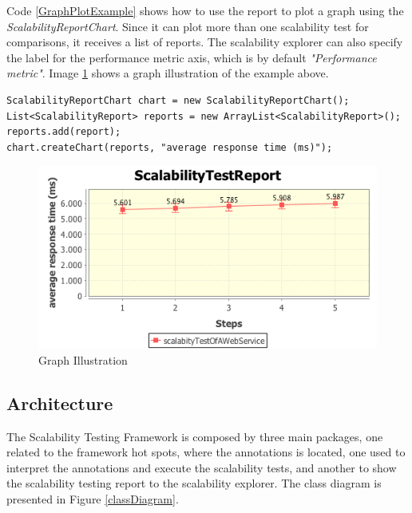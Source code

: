 Code \ref{GraphPlotExample} shows how to use the report to plot a graph using the \emph{ScalabilityReportChart}. Since it can plot more than one scalability test for comparisons, it receives a list of reports. The scalability explorer can also specify the label for the performance metric axis, which is by default \emph{"Performance metric"}. Image \ref{graphIllustration} shows a graph illustration of the example above.

\begin{lstlisting}
ScalabilityReportChart chart = new ScalabilityReportChart();
List<ScalabilityReport> reports = new ArrayList<ScalabilityReport>();
reports.add(report);
chart.createChart(reports, "average response time (ms)");
\end{lstlisting}

\begin{figure}[h]
\begin{center}
	\includegraphics[scale=0.7]{images/graphExample}
\caption{Graph Illustration}
\label{graphIllustration}
\end{center}
\end{figure}

\subsection{Architecture}
The Scalability Testing Framework is composed by three main packages, one related to the framework hot spots, where the annotations is located, one used to interpret the annotations and execute the scalability tests, and another to show the scalability testing report to the scalability explorer. The class diagram is presented in Figure \ref{classDiagram}.

